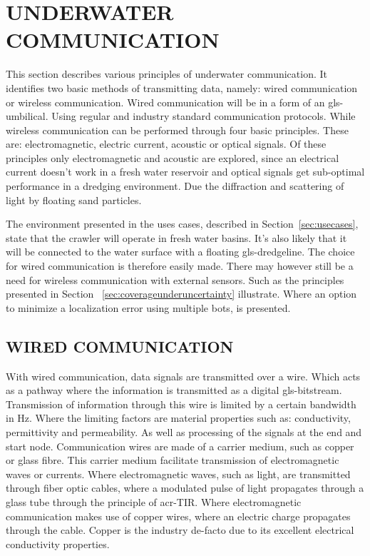 

\section{UNDERWATER COMMUNICATION}\label{sec:underwater_communication}
This section describes various principles of underwater communication. It identifies two basic methods of 
transmitting data, namely: wired communication or wireless communication. Wired communication will be in a form of an
\gls{gls-umbilical}. Using regular and industry standard communication protocols. While wireless communication can be
performed through four basic principles. These are: electromagnetic, electric current, acoustic or optical signals. 
Of these principles only electromagnetic and acoustic are explored, since an electrical current doesn't work in a 
fresh water reservoir and optical signals get sub-optimal performance in a dredging environment. Due the diffraction 
and scattering of light by floating sand particles.

The environment presented in the uses cases, described in Section~\ref{sec:usecases}, state that the crawler will
operate in fresh water basins. It's also likely that it will be connected to the water surface with a floating
\gls{gls-dredgeline}. The choice for wired communication is therefore easily made. There may however still be a need for
wireless communication with external sensors. Such as the principles presented in Section
~\ref{sec:coverageunderuncertainty} illustrate. Where an option to minimize a localization error using multiple bots, is
presented.

\subsection{WIRED COMMUNICATION}\label{sec:wired communication}
With wired communication, data signals are transmitted over a wire. Which acts as a pathway where the information is 
transmitted as a digital \gls{gls-bitstream}. Transmission of information through this wire is limited by a certain 
bandwidth in \( \si{\hertz} \).
Where the limiting factors are material properties such as: conductivity, permittivity and permeability. As well as 
processing of the signals at the end and start node. Communication wires are made of a carrier medium, such as copper
or glass fibre.
This carrier medium facilitate transmission of electromagnetic waves or currents. Where electromagnetic waves, such 
as light, are transmitted through fiber optic cables, where a modulated pulse of light propagates through a glass 
tube through the principle of \gls{acr-TIR}.
Where electromagnetic communication makes use of copper wires, where an electric charge propagates through the cable.
Copper is the industry de-facto due to its excellent electrical conductivity properties.

